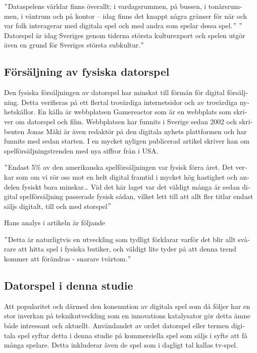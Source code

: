 \documentclass[11p]{article}
\begin{document}
\begin{otherlanguage}{swedish}
        \("\)Dataspelens världar finns överallt; i vardagsrummen, på bussen, i tonårsrummen, i väntrum och på kontor – idag finns det knappt några gränser för när och var folk interagerar med digitala spel och med andra som spelar dessa spel.\("\)
        \("\)Datorspel är idag Sveriges genom tiderna största kulturexport och spelen utgör även en grund för Sveriges största subkultur.\("\)\parencite{worlds}

        \setlength{\leftskip}{0cm}


        \subsection{Försäljning av fysiska datorspel}
        Den fysiska försäljningen av datorspel har minskat till förmån för digital försäljning.
        Detta verifieras på ett flertal trovärdiga internetsidor och av trovärdiga nyhetskällor.
        En källa är webbplatsen Gamereactor som är en webbplats som skriver om datorspel och film.
        Webbplatsen har funnits i Sverige sedan 2002 och skribenten Jonas Mäki är även redaktör på den digitala nyhets plattformen och har funnits med sedan starten.
        I en mycket nyligen publicerad artikel skriver han om spelförsäljningstrenden med nya siffror från i USA.

        \setlength{\leftskip}{1cm}

        \("\)Endast 5\% av den amerikanska spelförsäljningen var fysisk förra året.
        Det verkar som om vi rör oss mot en helt digital framtid i mycket hög hastighet och andelen fysiskt bara minskar\ldots
        Vid det här laget var det väldigt många år sedan digital spelförsäljning passerade fysisk sådan, vilket lett till att allt fler titlar endast säljs digitalt, till och med storspel\("\)

        \setlength{\leftskip}{0cm}

        Hans analys i artikeln är följande

        \setlength{\leftskip}{1cm}

        \("\)Detta är naturligtvis en utveckling som tydligt förklarar varför det blir allt svårare att hitta spel i fysiska butiker, och väldigt lite tyder på att denna trend kommer att förändras - snarare tvärtom.\("\)\parencite{amerikanska}

        \setlength{\leftskip}{0cm}

       \subsection{ Datorspel i denna studie}
        Att popularitet och därmed den konsumtion av digitala spel som då följer har en stor inverkan på teknikutveckling som en innovations katalysator gör detta ämne både intressant och aktuellt.
        Användandet av ordet datorspel eller termen digitala spel syftar detta i denna studie på kommersiella spel som säljs i syfte att få många spelare.
        Detta inkluderar även de spel som i dagligt tal kallas tv-spel.


\end{otherlanguage}
\end{document}
